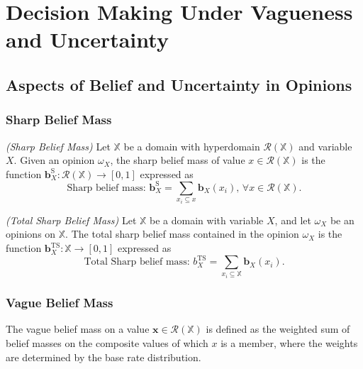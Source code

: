 
\section{Decision Making Under Vagueness and
Uncertainty}

\subsection{Aspects of Belief and Uncertainty in Opinions}

\subsubsection{Sharp Belief Mass}

\begin{definition}
    \emph{(Sharp Belief Mass)} Let $\mathbb{X}$ be a domain with hyperdomain $\mathcal{R}(\mathbb{X})$
and variable $X$. Given an opinion $\omega_X$, the sharp belief mass of value $x \in \mathcal{R}(\mathbb{X})$ is the function $\mathbf{b}^{\mathrm{S}}_X : \mathcal{R}(\mathbb{X}) \rightarrow [0, 1]$ expressed as
    \begin{equation}
        \text{Sharp belief mass: } \mathbf{b}^{\mathrm{S}}_X = \sum\limits_{x_i \subseteq x} \mathbf{b}_X(x_i)\text{, }\forall x \in \mathcal{R}(\mathbb{X})\text{.}
    \end{equation}
\end{definition}

\begin{definition}
    \emph{(Total Sharp Belief Mass)} Let $\mathbb{X}$ be a domain with variable $X$, and let $\omega_X$ be an opinions on $\mathbb{X}$. The total sharp belief mass contained in the opinion $\omega_X$ is the function $\mathbf{b}^{\mathrm{TS}}_X : \mathbb{X} \rightarrow [0, 1]$ expressed as
    \begin{equation}
        \text{Total Sharp belief mass: } b^{\mathrm{TS}}_X = \sum\limits_{x_i \subseteq \mathbb{X}} \mathbf{b}_X(x_i)\text{.}
    \end{equation}
\end{definition}

\subsubsection{Vague Belief Mass}

The vague belief mass on a value $\mathbf{x} \in \mathcal{R}(\mathbb{X})$ is defined as
the weighted sum of belief masses on the composite values of which $x$ is a member,
where the weights are determined by the base rate distribution.

